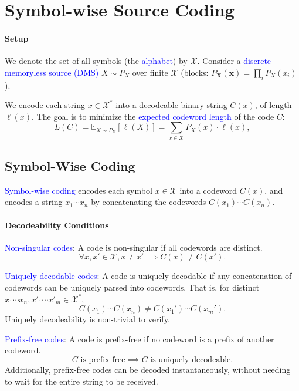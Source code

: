 \section{Symbol-wise Source Coding}
\paragraph{Setup}
We denote the set of all symbols (the \textcolor{Blue}{alphabet}) by
$\mathcal{X}$. Consider a \textcolor{Blue}{discrete memoryless source (DMS)} $X\sim P_X$ over finite $\mathcal X$ (blocks: $P_{\mathbf X}(\mathbf x)=\prod_i P_X(x_i)$).

We encode each string $x\in \mathcal{X}^{*}$ into a decodeable binary string
$C(x)$, of length $\ell(x)$. The goal is to minimize the
\textcolor{Blue}{expected codeword length} of the code $C$:
\[L(C)=\mathbb{E}_{X\sim P_X}\left[ \ell\left(X\right) \right]=\sum_{x\in\mathcal{X}} P_X(x)\cdot\ell\left(x\right),\]
\vspace{-4mm}
\subsection{Symbol-Wise Coding}
\textcolor{Blue}{Symbol-wise coding} encodes \textcolor{Bittersweet}{each
symbol} $x\in\mathcal{X}$ into a codeword $C(x)$, and
\textcolor{Bittersweet}{encodes a string} $x_1\cdots x_n$ by concatenating the
codewords $C(x_1)\cdots C(x_n)$.

\paragraph{Decodeability Conditions}
\textcolor{Blue}{Non-singular codes}: A code is non-singular if all codewords
are distinct.
\[\forall x,x'\in \mathcal{X}, x\neq x' \implies C(x)\neq C(x').\] 

\textcolor{Blue}{Uniquely decodable codes}: A code is uniquely decodable if any
concatenation of codewords can be uniquely parsed into codewords. That is, for
distinct $x_1\cdots x_n,x'_1\cdots x'_m\in \mathcal{X}^{*}$,
\[C(x_1)\cdots C(x_{n})\neq C(x_1')\cdots C(x_m').\]
Uniquely decodeability is \textcolor{Bittersweet}{non-trivial to verify}.

\textcolor{Blue}{Prefix-free codes}: A code is
prefix-free if no codeword is a prefix of another codeword.
\[C\text{ is prefix-free}\implies C\text{ is uniquely decodeable}.\]
Additionally, prefix-free codes can be decoded
\textcolor{Bittersweet}{instantaneously}, without needing to wait for the
entire string to be received.

